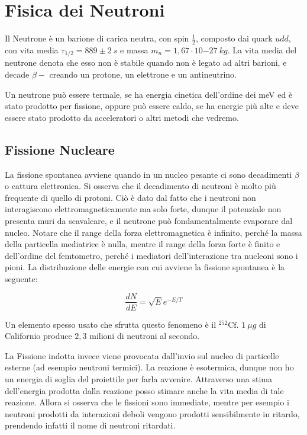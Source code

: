 \chapter{Fisica dei Neutroni}

Il Neutrone è un barione di carica neutra, con spin $\frac{1}{2}$, composto dai quark $udd$, con vita media $\tau_{1/2}=889\pm 2 \ s$ e massa $m_n=1,67\cdot 10{-27} \ kg$. 
La vita media del neutrone denota che esso non è stabile quando non è legato ad altri barioni, e decade $\beta - $ creando un protone, un elettrone e un antineutrino.

Un neutrone può essere termale, se ha energia cinetica dell'ordine dei meV ed è stato prodotto per fissione, oppure può essere caldo, se ha energie più alte e deve essere stato prodotto da acceleratori o altri metodi che vedremo.

\section{Fissione Nucleare}

La fissione spontanea avviene quando in un nucleo pesante ci sono decadimenti $\beta$ o cattura elettronica. Si osserva che il decadimento di neutroni è molto più frequente di quello di protoni. Ciò è dato dal fatto che i neutroni non interagiscono elettromagneticamente ma solo forte, dunque il potenziale non presenta muri da scavalcare, e il neutrone può fondamentalmente evaporare dal nucleo. 
Notare che  il range della forza elettromagnetica è infinito, perché la massa della particella mediatrice è nulla, mentre il range della forza forte è finito e dell'ordine del femtometro, perché i mediatori dell'interazione tra nucleoni sono i pioni. La distribuzione delle energie con cui avviene la fissione spontanea è la seguente:

\begin{equation}
\frac{dN}{dE}=\sqrt{E}e^{-E/T}
\end{equation}

Un elemento spesso usato che sfrutta questo fenomeno è il $^{252}\text{Cf}$. $1 \ \mu g$ di Californio produce $2,3$ milioni di neutroni al secondo.

La Fissione indotta invece viene provocata dall'invio sul nucleo di particelle esterne (ad esempio neutroni termici). La reazione è esotermica, dunque non ho un energia di soglia del proiettile per farla avvenire. Attraverso una stima dell'energia prodotta dalla reazione posso stimare anche la vita media di tale reazione. Allora si osserva che le fissioni sono immediate, mentre per esempio i neutroni prodotti da interazioni deboli vengono prodotti sensibilmente in ritardo, prendendo infatti il nome di neutroni ritardati.

